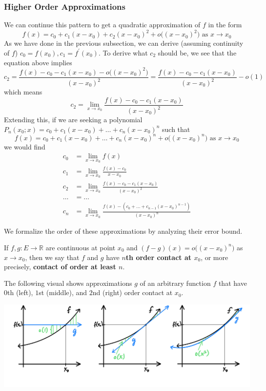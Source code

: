 \documentclass{article}
\begin{document}
    \subsubsection{Higher Order Approximations}
    We can continue this pattern to get a quadratic approximation of $f$ in the form
    \[f(x) = c_0 + c_1 (x - x_0) + c_2 (x - x_0)^2 + o\big((x - x_0)^2 \big) \text{ as } x \rightarrow x_0\]
    As we have done in the previous subsection, we can derive (assuming continuity of $f$) $c_0 = f(x_0), c_1 = f^\prime (x_0)$. To derive what $c_2$ should be, we see that the equation above implies
    \[c_2 = \frac{f(x) - c_0 - c_1 (x - x_0) - o\big((x - x_0)^2 \big)}{(x - x_0)^2} = \frac{f(x) - c_0 - c_1 (x - x_0)}{(x - x_0)^2} - o(1)\]
    which means
    \[c_2 = \lim_{x \rightarrow x_0} \frac{f(x) - c_0 - c_1 (x - x_0)}{(x - x_0)^2}\]
    Extending this, if we are seeking a polynomial $P_n(x_0; x) = c_0 + c_1 (x - x_0) + \ldots + c_n (x - x_0)^n$ such that
    \[f(x) = c_0 + c_1 (x - x_0) + \ldots + c_n (x - x_0)^n + o\big((x - x_0)^n\big) \text{ as } x \rightarrow x_0\]
    we would find 
    \begin{align*}
        c_0 & = \lim_{x \rightarrow x_0} f(x) \\
        c_1 & = \lim_{x \rightarrow x_0} \frac{f(x) - c_0}{x - x_0} \\
        c_2 & = \lim_{x \rightarrow x_0} \frac{f(x) - c_0 - c_1 (x - x_0)}{(x - x_0)^2} \\
        \ldots & = \ldots \\
        c_n & = \lim_{x \rightarrow x_0} \frac{f(x) - (c_0 + \ldots + c_{n-1}(x - x_0)^{n-1})}{(x - x_0)^n}
    \end{align*}

    We formalize the order of these approximations by analyzing their error bound. 

    \begin{definition}
      If $f, g: E \longrightarrow \mathbb{R}$ are continuous at point $x_0$ and $(f - g) (x) = o\big( (x - x_0)^n \big)$ as $x \rightarrow x_0$, then we say that $f$ and $g$ have \textbf{$n$th order contact at $x_0$}, or more precisely, \textbf{contact of order at least $n$}. 

      The following visual shows approximations $g$ of an arbitrary function $f$ that have $0$th (left), $1$st (middle), and $2$nd (right) order contact at $x_0$. 
      \begin{center}
          \includegraphics[scale=0.25]{img/nth_order_contact.PNG}
      \end{center}
    \end{definition}
\end{document}
